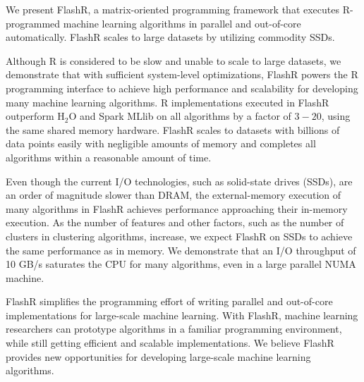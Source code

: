 We present FlashR, a matrix-oriented programming framework that executes
R-programmed machine learning algorithms in parallel and out-of-core
automatically. FlashR scales to large datasets by utilizing commodity SSDs.


Although R is considered to be slow and unable to scale to large datasets,
we demonstrate that with sufficient system-level optimizations, FlashR powers
the R programming interface to achieve high performance and scalability
for developing many machine learning algorithms. R implementations executed in FlashR
outperform H$_2$O and Spark MLlib on all algorithms by a factor of $3-20$, using
the same shared memory hardware. FlashR scales to datasets with billions of
data points easily with negligible amounts of memory and completes all
algorithms within a reasonable amount of time.

Even though the current I/O technologies, such as solid-state drives (SSDs),
are an order of magnitude slower than DRAM, the external-memory execution
of many algorithms in FlashR achieves performance approaching their in-memory
execution. As the number of features and other factors, such as the number of
clusters in clustering algorithms, increase, we expect FlashR on SSDs to achieve
the same performance as
in memory. We demonstrate that an I/O throughput of 10 GB/s saturates the CPU
for many algorithms, even in a large parallel NUMA machine. 

FlashR simplifies the programming effort of writing parallel and out-of-core
implementations for large-scale machine learning. With FlashR, machine learning
researchers can prototype algorithms in a familiar programming environment,
while still getting efficient and scalable implementations.
We believe FlashR provides new opportunities for developing large-scale
machine learning algorithms.
